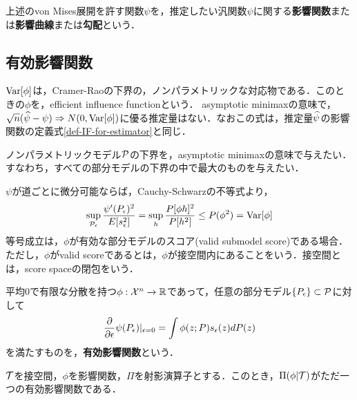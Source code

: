 \documentclass[uplatex,dvipdfmx]{jsreport}
\begin{document}
\begin{definition}
    上述のvon Mises展開を許す関数$\psi$を，推定したい汎関数$\psi$に関する\textbf{影響関数}または\textbf{影響曲線}または\textbf{勾配}という．
\end{definition}

\subsection{有効影響関数}

\begin{tcolorbox}[colframe=ForestGreen, colback=ForestGreen!10!white,breakable,colbacktitle=ForestGreen!40!white,coltitle=black,fonttitle=\bfseries\sffamily,
title=]
    $\Var[\phi]$は，Cramer-Raoの下界の，ノンパラメトリックな対応物である．このときの$\phi$を，efficient influence functionという．
    asymptotic minimaxの意味で，$\sqrt{n}(\wh{\psi}-\psi)\Rightarrow N(0,\Var[\phi])$に優る推定量はない．なおこの式は，推定量$\wh{\psi}$の影響関数の定義式\ref{def-IF-for-estimator}と同じ．
\end{tcolorbox}

\begin{problem}
    ノンパラメトリックモデル$\P$の下界を，asymptotic minimaxの意味で与えたい．すなわち，すべての部分モデルの下界の中で最大のものを与えたい．
\end{problem}
\begin{discussion}
    $\psi$が道ごとに微分可能ならば，Cauchy-Schwarzの不等式より，
    \[\sup_{\P_\ep}\frac{\psi'(P_\ep)^2}{E[s^2_\ep]}=\sup_{h}\frac{P[\phi h]^2}{P[h^2]}\le P(\phi^2)=\Var[\phi]\]
    等号成立は，$\phi$が有効な部分モデルのスコア(valid submodel score)である場合．ただし，$\phi$がvalid scoreであるとは，$\phi$が接空間内にあることをいう．接空間とは，score spaceの閉包をいう．
\end{discussion}

\begin{definition}
    平均$0$で有限な分散を持つ$\phi:\X^n\to\R$であって，任意の部分モデル$\{P_\ep\}\subset\P$に対して
    \[\pp{}{\ep}\psi(P_\ep)|_{\ep=0}=\int\phi(z;P)s_{\ep}(z)dP(z)\]
    を満たすものを，\textbf{有効影響関数}という．
\end{definition}

\begin{theorem}
    $\cT$を接空間，$\phi$を影響関数，$\Pi$を射影演算子とする．このとき，$\Pi(\phi|\cT)$がただ一つの有効影響関数である．
\end{theorem}
\end{document}
